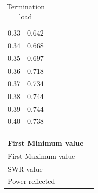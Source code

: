 \documentclass{report}
\begin{document}
\begin{multicols}{2}
\begin{table}[H]
\begin{tabular}{cc}
        0.33 & 0.642 \\
        0.34 & 0.668 \\
        0.35 & 0.697 \\
        0.36 & 0.718 \\
        0.37 & 0.734 \\
        0.38 & 0.744 \\
        0.39 & 0.744 \\
        0.40 & 0.738 \\
        \hline
        \end{tabular}
        \caption{Termination load}
    \end{table}
    \begin{table}[H]
        \begin{tabular}{|l|l|}
            \hline
            First Minimum value & \\ \hline
            First Maximum value & \\ \hline
            SWR value & \\ \hline
            Power reflected & \\ \hline
            
        \end{tabular}
    \end{table}
    \end{multicols}
\end{document}
